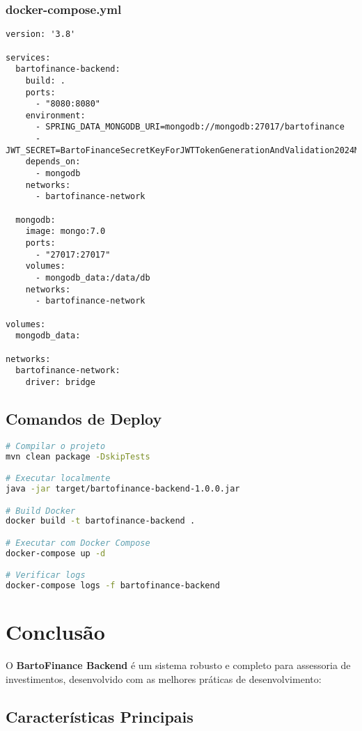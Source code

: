 \documentclass[12pt,a4paper]{article}
\begin{document}
\subsubsection{docker-compose.yml}

\begin{lstlisting}[caption=docker-compose.yml]
version: '3.8'

services:
  bartofinance-backend:
    build: .
    ports:
      - "8080:8080"
    environment:
      - SPRING_DATA_MONGODB_URI=mongodb://mongodb:27017/bartofinance
      - JWT_SECRET=BartoFinanceSecretKeyForJWTTokenGenerationAndValidation2024MustBeAtLeast256BitsLong
    depends_on:
      - mongodb
    networks:
      - bartofinance-network

  mongodb:
    image: mongo:7.0
    ports:
      - "27017:27017"
    volumes:
      - mongodb_data:/data/db
    networks:
      - bartofinance-network

volumes:
  mongodb_data:

networks:
  bartofinance-network:
    driver: bridge
\end{lstlisting}

\subsection{Comandos de Deploy}

\begin{lstlisting}[language=bash]
# Compilar o projeto
mvn clean package -DskipTests

# Executar localmente
java -jar target/bartofinance-backend-1.0.0.jar

# Build Docker
docker build -t bartofinance-backend .

# Executar com Docker Compose
docker-compose up -d

# Verificar logs
docker-compose logs -f bartofinance-backend
\end{lstlisting}

\section{Conclusão}

O \textbf{BartoFinance Backend} é um sistema robusto e completo para assessoria de investimentos, desenvolvido com as melhores práticas de desenvolvimento:

\subsection{Características Principais}
\end{document}
